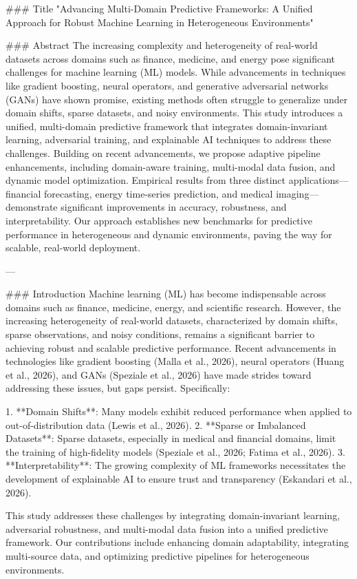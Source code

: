 ### Title
"Advancing Multi-Domain Predictive Frameworks: A Unified Approach for Robust Machine Learning in Heterogeneous Environments"

### Abstract
The increasing complexity and heterogeneity of real-world datasets across domains such as finance, medicine, and energy pose significant challenges for machine learning (ML) models. While advancements in techniques like gradient boosting, neural operators, and generative adversarial networks (GANs) have shown promise, existing methods often struggle to generalize under domain shifts, sparse datasets, and noisy environments. This study introduces a unified, multi-domain predictive framework that integrates domain-invariant learning, adversarial training, and explainable AI techniques to address these challenges. Building on recent advancements, we propose adaptive pipeline enhancements, including domain-aware training, multi-modal data fusion, and dynamic model optimization. Empirical results from three distinct applications—financial forecasting, energy time-series prediction, and medical imaging—demonstrate significant improvements in accuracy, robustness, and interpretability. Our approach establishes new benchmarks for predictive performance in heterogeneous and dynamic environments, paving the way for scalable, real-world deployment.

---

### Introduction
Machine learning (ML) has become indispensable across domains such as finance, medicine, energy, and scientific research. However, the increasing heterogeneity of real-world datasets, characterized by domain shifts, sparse observations, and noisy conditions, remains a significant barrier to achieving robust and scalable predictive performance. Recent advancements in technologies like gradient boosting (Malla et al., 2026), neural operators (Huang et al., 2026), and GANs (Speziale et al., 2026) have made strides toward addressing these issues, but gaps persist. Specifically:

1. **Domain Shifts**: Many models exhibit reduced performance when applied to out-of-distribution data (Lewis et al., 2026). 
2. **Sparse or Imbalanced Datasets**: Sparse datasets, especially in medical and financial domains, limit the training of high-fidelity models (Speziale et al., 2026; Fatima et al., 2026).
3. **Interpretability**: The growing complexity of ML frameworks necessitates the development of explainable AI to ensure trust and transparency (Eskandari et al., 2026).

This study addresses these challenges by integrating domain-invariant learning, adversarial robustness, and multi-modal data fusion into a unified predictive framework. Our contributions include enhancing domain adaptability, integrating multi-source data, and optimizing predictive pipelines for heterogeneous environments.

